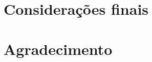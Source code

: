 \documentclass[isoft]{ufgposter}
\begin{document}
\begin{poster}
\lipsum[5]
\cite{chollet2015keras}

\section{Considerações finais}

\lipsum[15]

\section{Agradecimento}

\lipsum[57]





\end{poster}
\end{document}
